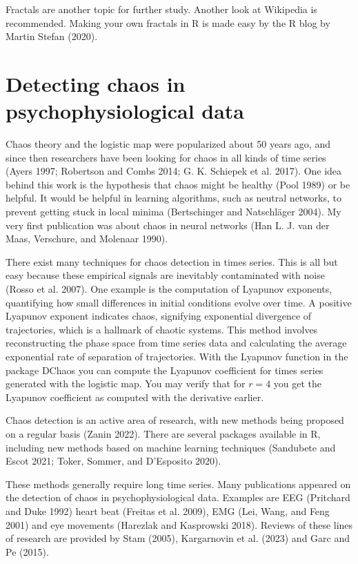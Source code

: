 \documentclass[
  a4paper,
  DIV=11,
  numbers=noendperiod,
  oneside]{scrreprt}
\begin{document}
Fractals are another topic for further study. Another look at Wikipedia
is recommended. Making your own fractals in R is made easy by the R blog
by Martin Stefan (2020).

\hypertarget{sec-Detecting-chaos-in-psychophysiological-data}{%
\section{Detecting chaos in psychophysiological
data}\label{sec-Detecting-chaos-in-psychophysiological-data}}

Chaos theory and the logistic map were popularized about 50 years ago,
and since then researchers have been looking for chaos in all kinds of
time series (Ayers 1997; Robertson and Combs 2014; G. K. Schiepek et al.
2017). One idea behind this work is the hypothesis that chaos might be
healthy (Pool 1989) or be helpful. It would be helpful in learning
algorithms, such as neutral networks, to prevent getting stuck in local
minima (Bertschinger and Natschläger 2004). My very first publication
was about chaos in neural networks (Han L. J. van der Maas, Verschure,
and Molenaar 1990).

There exist many techniques for chaos detection in times series. This is
all but easy because these empirical signals are inevitably contaminated
with noise (Rosso et al. 2007). One example is the computation of
Lyapunov exponents, quantifying how small differences in initial
conditions evolve over time. A positive Lyapunov exponent indicates
chaos, signifying exponential divergence of trajectories, which is a
hallmark of chaotic systems. This method involves reconstructing the
phase space from time series data and calculating the average
exponential rate of separation of trajectories. With the Lyapunov
function in the package DChaos you can compute the Lyapunov coefficient
for times series generated with the logistic map. You may verify that
for \(r = 4\) you get the Lyapunov coefficient as computed with the
derivative earlier.

Chaos detection is an active area of research, with new methods being
proposed on a regular basis (Zanin 2022). There are several packages
available in R, including new methods based on machine learning
techniques (Sandubete and Escot 2021; Toker, Sommer, and D'Esposito
2020).

These methods generally require long time series. Many publications
appeared on the detection of chaos in psychophysiological data. Examples
are EEG (Pritchard and Duke 1992) heart beat (Freitas et al. 2009), EMG
(Lei, Wang, and Feng 2001) and eye movements (Harezlak and Kasprowski
2018). Reviews of these lines of research are provided by Stam (2005),
Kargarnovin et al. (2023) and Garc and Pe (2015).
\end{document}

